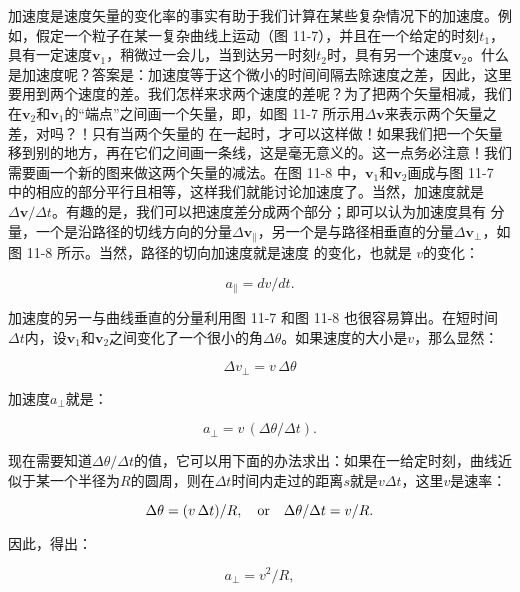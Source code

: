 \documentclass[12pt,oneside]{book}
\providecommand{\FLPvec}[1]{\boldsymbol{#1}}
\providecommand{\FLPv}[0]{\FLPvec{v}}
\begin{document}
加速度是速度矢量的变化率的事实有助于我们计算在某些复杂情况下的加速度。例如，假定一个粒子在某一复杂曲线上运动（图 11-7），并且在一个给定的时刻$t_1$，具有一定速度$\boldsymbol{v}_1$，稍微过一会儿，当到达另一时刻$t_2$时，具有另一个速度$\boldsymbol{v}_2$。什么是加速度呢？答案是：加速度等于这个微小的时间间隔去除速度之差，因此，这里要用到两个速度的差。我们怎样来求两个速度的差呢？为了把两个矢量相减，我们在$\boldsymbol{v}_2$和$\boldsymbol{v}_1$的“端点”之间画一个矢量，即，如图 11-7 所示用$\Delta\boldsymbol{v}$来表示两个矢量之差，对吗？！只有当两个矢量的 在一起时，才可以这样做！如果我们把一个矢量移到别的地方，再在它们之间画一条线，这是毫无意义的。这一点务必注意！我们需要画一个新的图来做这两个矢量的减法。在图 11-8 中，$\boldsymbol{v}_1$和$\boldsymbol{v}_2$画成与图 11-7 中的相应的部分平行且相等，这样我们就能讨论加速度了。当然，加速度就是$\Delta\boldsymbol{v}/\Delta t$。有趣的是，我们可以把速度差分成两个部分；即可以认为加速度具有 分量，一个是沿路径的切线方向的分量$\Delta\FLPv_\parallel$，另一个是与路径相垂直的分量$\Delta\FLPv_\perp$，如图 11-8 所示。当然，路径的切向加速度就是速度 的变化，也就是 $v$的变化：


\begin{equation}
\label{Eq:I:11:15}
a_\parallel=dv/dt.
\end{equation}


加速度的另一与曲线垂直的分量利用图 11-7 和图 11-8 也很容易算出。在短时间$\Delta t$内，设$\boldsymbol{v}_1$和$\boldsymbol{v}_2$之间变化了一个很小的角$\Delta\theta$。如果速度的大小是$v$，那么显然：


\begin{equation*}
\Delta v_\perp=v\,\Delta\theta
\end{equation*}

加速度$a_\perp$就是：

\begin{equation*}
a_\perp=v\,(\Delta\theta/\Delta t).
\end{equation*}


现在需要知道$\Delta\theta/\Delta t$的值，它可以用下面的办法求出：如果在一给定时刻，曲线近似于某一个半径为$R$的圆周，则在$\Delta t$时间内走过的距离$s$就是$v\Delta t$，这里$v$是速率：


\begin{equation}
\Delta\theta=(v\,\Delta t)/R,\quad
\text{or}\quad
\Delta\theta/\Delta t=v/R.\notag
\end{equation}

因此，得出：

\begin{equation}
\label{Eq:I:11:16}
a_\perp=v^2/R,
\end{equation}
\end{document}
